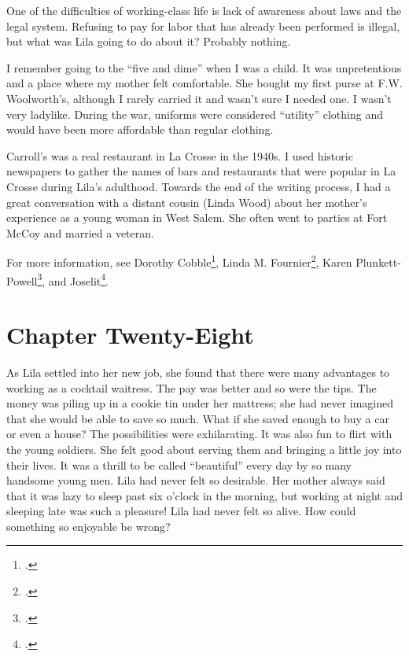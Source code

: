 \documentclass[
  letterpaper,
]{book}
\begin{document}
One of the difficulties of working-class life is lack of awareness about
laws and the legal system. Refusing to pay for labor that has already
been performed is illegal, but what was Lila going to do about it?
Probably nothing.

I remember going to the ``five and dime'' when I was a child. It was
unpretentious and a place where my mother felt comfortable. She bought
my first purse at F.W. Woolworth's, although I rarely carried it and
wasn't sure I needed one. I wasn't very ladylike. During the war,
uniforms were considered ``utility'' clothing and would have been more
affordable than regular clothing.

Carroll's was a real restaurant in La Crosse in the 1940s. I used
historic newspapers to gather the names of bars and restaurants that
were popular in La Crosse during Lila's adulthood. Towards the end of
the writing process, I had a great conversation with a distant cousin
(Linda Wood) about her mother's experience as a young woman in West
Salem. She often went to parties at Fort McCoy and married a veteran.

For more information, see Dorothy Cobble\footnote{.}, Linda M.
Fournier\footnote{.}, Karen
Plunkett-Powell\footnote{.}, and
Joselit\footnote{.}.


\chapter{Chapter Twenty-Eight}\label{chapter-twenty-eight}

As Lila settled into her new job, she found that there were many
advantages to working as a cocktail waitress. The pay was better and so
were the tips. The money was piling up in a cookie tin under her
mattress; she had never imagined that she would be able to save so much.
What if she saved enough to buy a car or even a house? The possibilities
were exhilarating. It was also fun to flirt with the young soldiers. She
felt good about serving them and bringing a little joy into their lives.
It was a thrill to be called ``beautiful'' every day by so many handsome
young men. Lila had never felt so desirable. Her mother always said that
it was lazy to sleep past six o'clock in the morning, but working at
night and sleeping late was such a pleasure! Lila had never felt so
alive. How could something so enjoyable be wrong?
\end{document}
